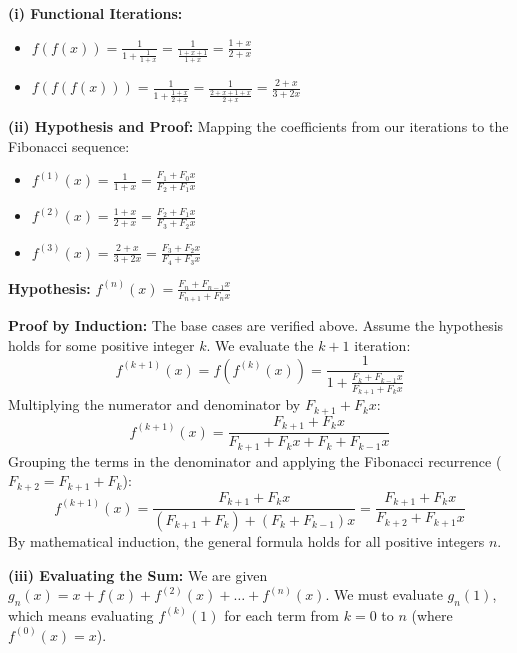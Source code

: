 \begin{solution}
\textbf{(i) Functional Iterations:}
\begin{itemize}[leftmargin=*]
    \item $f(f(x)) = \frac{1}{1 + \frac{1}{1+x}} = \frac{1}{\frac{1+x+1}{1+x}} = \frac{1+x}{2+x}$
    \item $f(f(f(x))) = \frac{1}{1 + \frac{1+x}{2+x}} = \frac{1}{\frac{2+x+1+x}{2+x}} = \frac{2+x}{3+2x}$
\end{itemize}

\textbf{(ii) Hypothesis and Proof:}
Mapping the coefficients from our iterations to the Fibonacci sequence:
\begin{itemize}[leftmargin=*]
    \item $f^{(1)}(x) = \frac{1}{1+x} = \frac{F_1 + F_0 x}{F_2 + F_1 x}$
    \item $f^{(2)}(x) = \frac{1+x}{2+x} = \frac{F_2 + F_1 x}{F_3 + F_2 x}$
    \item $f^{(3)}(x) = \frac{2+x}{3+2x} = \frac{F_3 + F_2 x}{F_4 + F_3 x}$
\end{itemize}

\textbf{Hypothesis:} $f^{(n)}(x) = \frac{F_n + F_{n-1}x}{F_{n+1} + F_n x}$

\textbf{Proof by Induction:}
The base cases are verified above. Assume the hypothesis holds for some positive integer $k$. We evaluate the $k+1$ iteration:
\[
f^{(k+1)}(x) = f(f^{(k)}(x)) = \frac{1}{1 + \frac{F_k + F_{k-1}x}{F_{k+1} + F_k x}}
\]
Multiplying the numerator and denominator by $F_{k+1} + F_k x$:
\[
f^{(k+1)}(x) = \frac{F_{k+1} + F_k x}{F_{k+1} + F_k x + F_k + F_{k-1}x}
\]
Grouping the terms in the denominator and applying the Fibonacci recurrence ($F_{k+2} = F_{k+1} + F_k$):
\[
f^{(k+1)}(x) = \frac{F_{k+1} + F_k x}{(F_{k+1} + F_k) + (F_k + F_{k-1})x} = \frac{F_{k+1} + F_k x}{F_{k+2} + F_{k+1}x}
\]
By mathematical induction, the general formula holds for all positive integers $n$.

\textbf{(iii) Evaluating the Sum:}
We are given $g_n(x) = x + f(x) + f^{(2)}(x) + \dots + f^{(n)}(x)$.
We must evaluate $g_n(1)$, which means evaluating $f^{(k)}(1)$ for each term from $k=0$ to $n$ (where $f^{(0)}(x) = x$).


\end{solution}
